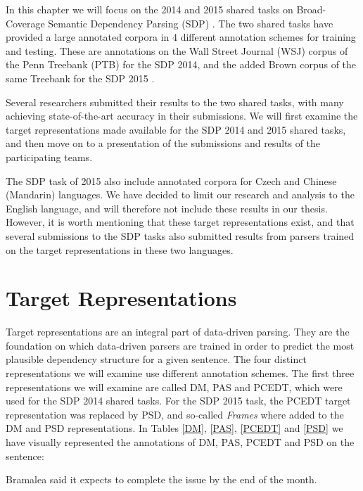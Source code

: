 In this chapter we will focus on the 2014 and 2015 shared tasks on Broad-Coverage Semantic Dependency Parsing (SDP) \cite{Oepen:14, Oepen:15}. The two shared tasks have provided a large annotated corpora in 4 different annotation schemes for training and testing. These are annotations on the Wall Street Journal (WSJ) corpus of the Penn Treebank (PTB) for the SDP 2014, and the added Brown corpus of the same Treebank for the SDP 2015 \cite{Mar:San:Mar:93}.

Several researchers submitted their results to the two shared tasks, with many achieving state-of-the-art accuracy in their submissions. We will first examine the target representations made available for the SDP 2014 and 2015 shared tasks, and then move on to a presentation of the submissions and results of the participating teams.

The SDP task of 2015 also include annotated corpora for Czech and Chinese (Mandarin) languages. We have decided to limit our research and analysis to the English language, and will therefore not include these results in our thesis. However, it is worth mentioning that these target representations exist, and that several submissions to the SDP tasks also submitted results from parsers trained on the target representations in these two languages.

\section{Target Representations}
\label{sec:representations}

Target representations are an integral part of data-driven parsing. They are the foundation on which data-driven parsers are trained in order to predict the most plausible dependency structure for a given sentence. The four distinct representations we will examine use different annotation schemes. The first three representations we will examine are called DM, PAS and PCEDT, which were used for the SDP 2014 shared tasks. For the SDP 2015 task, the PCEDT target representation was replaced by PSD, and so-called \textit{Frames} where added to the DM and PSD representations. In Tables \ref{DM}, \ref{PAS}, \ref{PCEDT} and \ref{PSD} we have visually represented the annotations of DM, PAS, PCEDT and PSD on the sentence:

\begin{displayquote}
Bramalea said it expects to complete the issue by the end of the month.
\end{displayquote}

